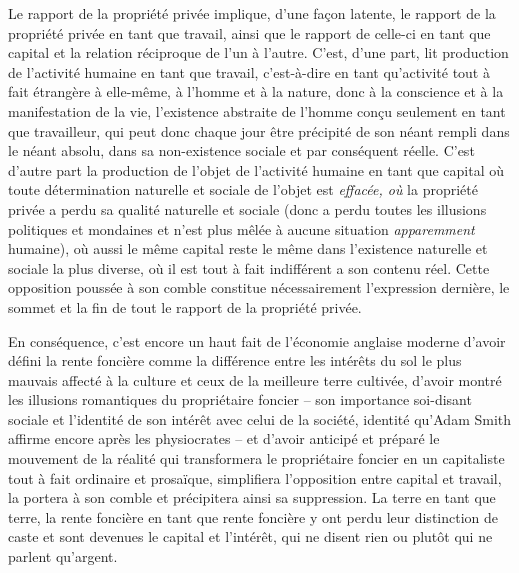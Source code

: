 \documentclass[french,twoside]{book} %
\begin{document}
Le rapport de la propriété privée implique, d’une façon latente, le rapport de la propriété privée en tant que travail, ainsi que le rapport de celle-ci en tant que capital et la relation réciproque de l’un à l’autre. C’est, d’une part, lit production de l’activité humaine en tant que travail, c’est-à-dire en tant qu’activité tout à fait étrangère à elle-même, à l’homme et à la nature, donc à la conscience et à la manifestation de la vie, l’existence abstraite de l’homme conçu seulement en tant que travailleur, qui peut donc chaque jour être précipité de son néant rempli dans le néant absolu, dans sa non-existence sociale et par conséquent réelle. C’est d’autre part la production de l’objet de l’activité humaine en tant que capital où toute détermination naturelle et sociale de l’objet est \emph{effacée, où} la propriété privée a perdu sa qualité naturelle et sociale (donc a perdu toutes les illusions politiques et mondaines et n’est plus mêlée à aucune situation \emph{apparemment} humaine), où aussi le même capital reste le même dans l’existence naturelle et sociale la plus diverse, où il est tout à fait indifférent a son contenu réel. Cette opposition poussée à son comble constitue nécessairement l’expression dernière, le sommet et la fin de tout le rapport de la propriété privée.\par
En conséquence, c’est encore un haut fait de l’économie anglaise moderne d’avoir défini la rente foncière comme la différence entre les intérêts du sol le plus mauvais affecté à la culture et ceux de la meilleure terre cultivée, d’avoir montré les illusions romantiques du propriétaire foncier – son importance soi-disant sociale et l’identité de son intérêt avec celui de la société, identité qu’Adam Smith affirme encore après les physiocrates – et d’avoir anticipé et préparé le mouvement de la réalité qui transformera le propriétaire foncier en un capitaliste tout à fait ordinaire et prosaïque, simplifiera l’opposition entre capital et travail, la portera à son comble et précipitera ainsi sa suppression. La terre en tant que terre, la rente foncière en tant que rente foncière y ont perdu leur distinction de caste et sont devenues le capital et l’intérêt, qui ne disent rien ou plutôt qui ne parlent qu’argent.\par
\end{document}
